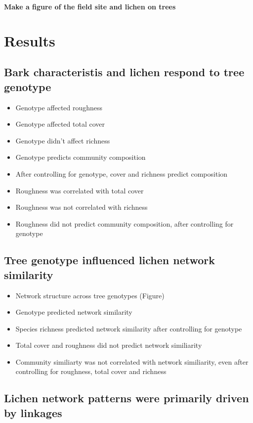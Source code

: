\documentclass[9pt,twocolumn,twoside,lineno]{pnas-new}
\begin{document}
{\textbf{Make a figure of the field site and lichen on trees}



\section*{Results}

\subsection*{Bark characteristis and lichen respond to tree genotype}

\begin{itemize}
\item Genotype affected roughness
\item Genotype affected total cover
\item Genotype didn't affect richness
\item Genotype predicts community composition
\item After controlling for genotype, cover and richness predict composition
\item Roughness was correlated with total cover
\item Roughness was not correlated with richness
\item Roughness did not predict community composition, after
  controlling for genotype
\end{itemize}


\subsection*{Tree genotype influenced lichen network similarity}

\begin{itemize}
\item Network structure across tree genotypes (Figure)
\item Genotype predicted network similarity
\item Species richness predicted network similarity after controlling
  for genotype
\item Total cover and roughness did not predict network similiarity
\item Community similiarty was not correlated with network
  similiarity, even after controlling for roughness, total cover and richness
\end{itemize}

\subsection*{Lichen network patterns were primarily driven by linkages}

}
\end{document}
